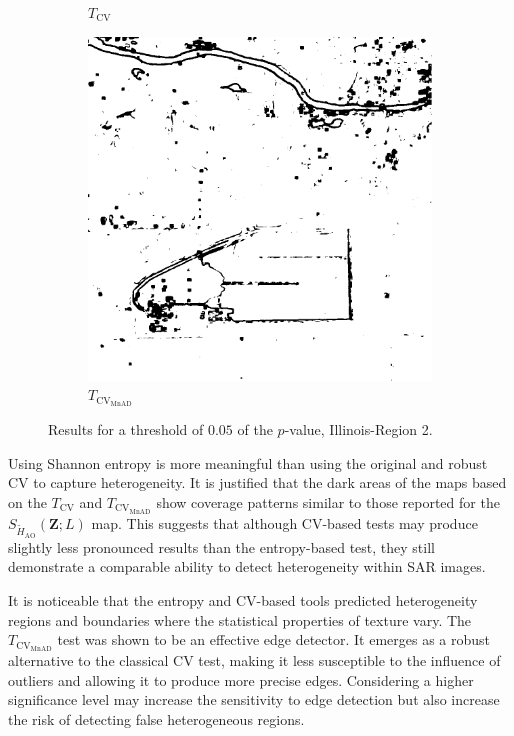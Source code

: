 \begin{figure}[H]
\begin{subfigure}[b]{0.3\textwidth}
    \caption{$T_\text{CV}$}
    \label{fig:Illinois_crops_0.05-2}
  \end{subfigure}
  \hfill
  \begin{subfigure}[b]{0.3\textwidth}
    \centering
    \includegraphics[width=\textwidth]{../../Figures/PNG/mnad_005_Illinois_crops_1024}
     \caption{$T_{\text{CV}_{\text{MnAD}}}$}
    \label{fig:Illinois_crops_0.05-3}
  \end{subfigure}
  \caption{Results for a threshold of $0.05$ of the $p$-value, Illinois-Region 2. }
  \label{fig:Illinois_crops_0.05}
\end{figure}



Using Shannon entropy is more meaningful than using the original and
robust CV to capture heterogeneity. It is justified that the dark areas
of the maps based on the \(T_\text{CV}\) and
\(T_{\text{CV}_{\text{MnAD}}}\) show coverage patterns similar to those
reported for the \(S_{\widetilde{H}_{\text{AO}}}(\bm{Z}; L)\) map. 
This suggests that although CV-based tests may produce slightly less
pronounced results than the entropy-based test, they still demonstrate a
comparable ability to detect heterogeneity within SAR images.

It is noticeable that the entropy and CV-based tools predicted
heterogeneity regions and boundaries where the statistical properties of
texture vary. The \(T_{\text{CV}_{\text{MnAD}}}\) test was shown to be
an effective edge detector. 
It emerges as a robust alternative to the classical CV test, making it less susceptible to the influence of
outliers and allowing it to produce more precise edges. 
Considering a
higher significance level may increase the sensitivity to edge detection
but also increase the risk of detecting false heterogeneous regions.

